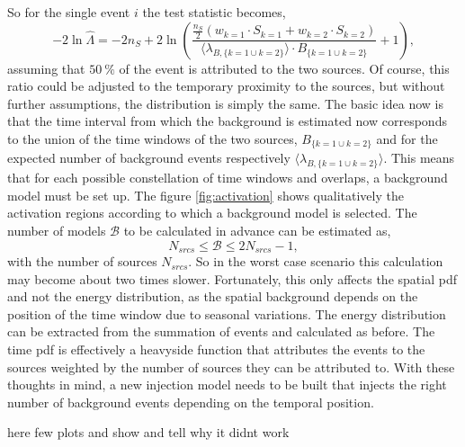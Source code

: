 So for the single event $i$ the test statistic becomes,
\begin{equation}
    -2\ln{\hat{\Lambda}} =-2n_S +2\ln\left(\frac{\frac{n_S}{2}(w_{k=1}\cdot S_{k=1} + w_{k=2} \cdot S_{k=2})}{\langle\lambda_{B,\{k=1\cup k=2\}}\rangle \cdot B_{\{k=1\cup k=2\}}}+1\right) \label{eq:simple_example},
\end{equation}
assuming that $\SI{50}{\percent}$ of the event is attributed to the two sources.
Of course, this ratio could be adjusted to the temporary proximity to the sources, but without further assumptions, the distribution is simply the same.
The basic idea now is that the time interval from which the background is estimated now corresponds to the union of the time windows of the two sources, $B_{\{k=1\cup k=2\}}$ and for the expected number of background events respectively $\langle\lambda_{B,\{k=1\cup k=2\}}\rangle$.
This means that for each possible constellation of time windows and overlaps, a background model must be set up.
The figure \ref{fig:activation} shows qualitatively the activation regions according to which a background model is selected.
The number of models $\mathcal{B}$ to be calculated in advance can be estimated as,
\begin{equation}
  N_{srcs} \leq \mathcal{B}\leq 2N_{srcs}-1, \label{eq:number_of_models}
\end{equation}
with the number of sources $N_{srcs}$.
So in the worst case scenario this calculation may become about two times slower.
Fortunately, this only affects the spatial pdf and not the energy distribution, as the spatial background depends on the position of the time window due to seasonal variations.
The energy distribution can be extracted from the summation of events and calculated as before.
The time pdf is effectively a heavyside function that attributes the events to the sources weighted by the number of sources they can be attributed to.
With these thoughts in mind, a new injection model needs to be built that injects the right number of background events depending on the temporal position.

here few plots and show and tell why it didnt work
